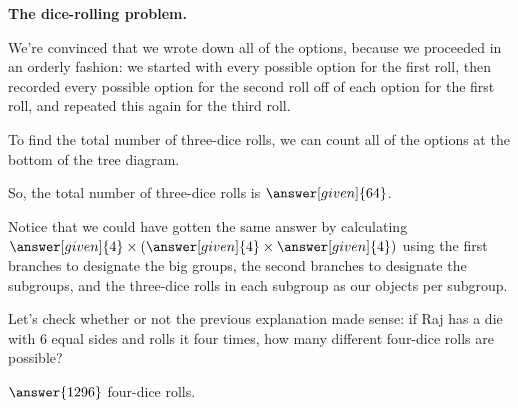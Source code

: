 \documentclass{ximera}
\begin{document}
\begin{question} {\bf The dice-rolling problem.}
\begin{explanation}
\begin{image}
\begin{tikzpicture}[
  level 1/.style={sibling distance=120mm},
  level 2/.style={sibling distance=30mm},
  level 3/.style={sibling distance=5mm},
  level 4/.style={sibling distance=7mm}
]
\end{tikzpicture}
\end{image}
We're convinced that we wrote down all of the options, because we proceeded in an orderly fashion: we started with every possible option for the first roll, then recorded every possible option for the second roll off of each option for the first roll, and repeated this again for the third roll.

To find the total number of three-dice rolls, we can count all of the options at the bottom of the tree diagram.


So, the total number of three-dice rolls is $\answer[given]{64}$.

Notice that we could have gotten the same answer by calculating $\answer[given]{4} \times \left ( \answer[given]{4} \times \answer[given]{4} \right)$ using the first branches to designate the big groups, the second branches to designate the subgroups, and the three-dice rolls in each subgroup as our objects per subgroup.


\end{explanation}
\end{question}


\begin{question}
Let's check whether or not the previous explanation made sense: if Raj has a die with $6$ equal sides and rolls it four times, how many different four-dice rolls are possible?

\begin{prompt}
$\answer{1296}$ four-dice rolls.
\end{prompt}
\end{question}
\end{document}
